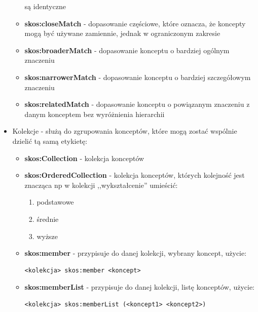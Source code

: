 \documentclass[12pt,a4paper,notitlepage]{article}
\begin{document}
\begin{itemize}
\begin{itemize}
          są identyczne
        \item \textbf{skos:closeMatch} - dopasowanie częściowe, które oznacza,
          że koncepty mogą być używane zamiennie, jednak w ograniczonym
          zakresie
        \item \textbf{skos:broaderMatch} - dopasowanie konceptu o bardziej
          ogólnym znaczeniu
        \item \textbf{skos:narrowerMatch} - dopasowanie konceptu o bardziej
          szczegółowym znaczeniu
        \item \textbf{skos:relatedMatch} - dopasowanie konceptu o powiązanym
          znaczeniu z danym konceptem bez wyróżnienia hierarchii
      \end{itemize}
    \item Kolekcje - służą do zgrupowania konceptów, które mogą zostać wspólnie
      dzielić tą samą etykietę:
      \begin{itemize}
        \item \textbf{skos:Collection} - kolekcja konceptów
        \item \textbf{skos:OrderedCollection} - kolekcja konceptów, których
          kolejność jest znacząca np w kolekcji ,,wykształcenie'' umieścić:
          \begin{enumerate}
            \item podstawowe
            \item średnie
            \item wyższe
          \end{enumerate}
        \item \textbf{skos:member} - przypisuje do danej kolekcji, wybrany
          koncept, użycie:
\begin{verbatim}
<kolekcja> skos:member <koncept>
\end{verbatim}
        \item \textbf{skos:memberList} - przypisuje do danej kolekcji, listę
          konceptów, użycie:
\begin{verbatim}
<kolekcja> skos:memberList (<koncept1> <koncept2>)
\end{verbatim}
      \end{itemize}
\end{itemize}
{}
\end{document}

